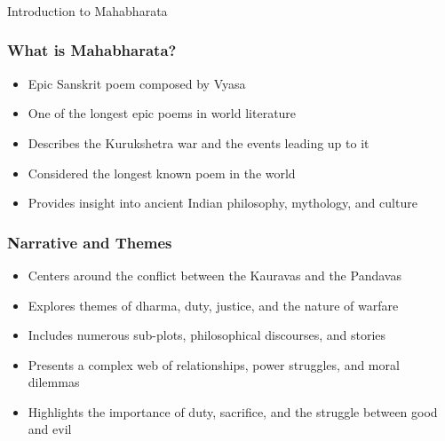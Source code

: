 \begin{frame}[fragile]\frametitle{}
\begin{center}
{\Large Introduction to Mahabharata}
\end{center}
\end{frame}

\begin{frame}[fragile]\frametitle{What is Mahabharata?}
    \begin{itemize}
        \item Epic Sanskrit poem composed by Vyasa
        \item One of the longest epic poems in world literature
        \item Describes the Kurukshetra war and the events leading up to it
        \item Considered the longest known poem in the world
        \item Provides insight into ancient Indian philosophy, mythology, and culture
    \end{itemize}
\end{frame}

\begin{frame}[fragile]\frametitle{Narrative and Themes}
    \begin{itemize}
        \item Centers around the conflict between the Kauravas and the Pandavas
        \item Explores themes of dharma, duty, justice, and the nature of warfare
        \item Includes numerous sub-plots, philosophical discourses, and stories
        \item Presents a complex web of relationships, power struggles, and moral dilemmas
        \item Highlights the importance of duty, sacrifice, and the struggle between good and evil
    \end{itemize}
\end{frame}

